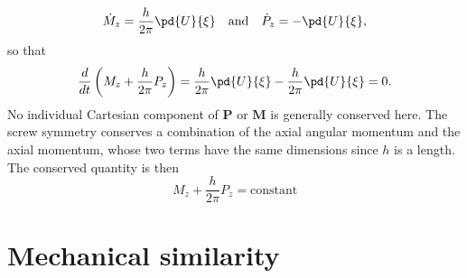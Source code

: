\begin{subproblem}
{\begin{equation*}
    \Dot{M}_z = \frac{h}{2\pi} \pd{U}{\xi} \quad \text{and} \quad \Dot{P}_z = -\pd{U}{\xi},
\end{equation*}
so that
\begin{equation*}
    \frac{d}{dt} \left( M_z + \frac{h}{2\pi} P_z \right) = \frac{h}{2\pi} \pd{U}{\xi} - \frac{h}{2\pi} \pd{U}{\xi} = 0 .
\end{equation*}
No individual Cartesian component of $\mathbf{P}$ or $\mathbf{M}$ is generally conserved here. The screw symmetry conserves a combination of the axial angular momentum and the axial momentum, whose two terms have the same dimensions since $h$ is a length. The conserved quantity is then
}
{
\begin{equation*}
    M_z + \frac{h}{2\pi} P_z = \text{constant}
\end{equation*}
}
\end{subproblem}

\section{Mechanical similarity}


